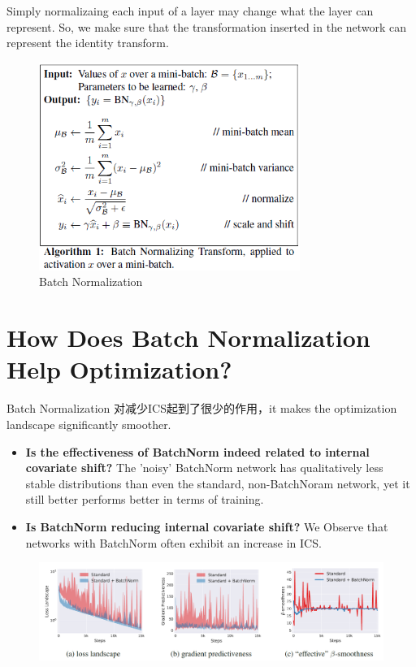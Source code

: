 Simply normalizaing each input of a layer may change what the layer can represent. So, we make sure that
the transformation inserted in the network can represent the identity transform.
\begin{figure}[H]
    \centering
    \includegraphics[width=8.5cm]{images/bn_algorithm.png}
    \caption{Batch Normalization}
    \label{fig:batchnorm}
\end{figure}

\section{How Does Batch Normalization Help Optimization?}
Batch Normalization 对减少ICS起到了很少的作用，it makes the optimization landscape significantly smoother.
\begin{itemize}
    \item \textbf{Is the effectiveness of BatchNorm indeed related to internal covariate shift?} The 'noisy' BatchNorm
    network has qualitatively less stable distributions than even the standard, non-BatchNoram network, yet it still
    better performs better in terms of training.
    \item \textbf{Is BatchNorm reducing internal covariate shift?} We Observe that networks with BatchNorm often
    exhibit an increase in ICS.
\end{itemize}
\begin{figure}[H]
    \centering
    \includegraphics[width=14cm]{images/bn_landscape.png}
    \label{fig:bn_landscape}
\end{figure}


